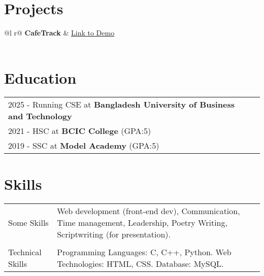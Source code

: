 \documentclass[a4paper,12pt]{article}
\begin{document}
  
\section{Projects}

\begin{tabularx}{\linewidth}{ @{}l r@{} }
\textbf{CafeTrack} & \hfill \href{https://github.com/samia-homayara/Cafetrack}{Link to Demo} \\[3.75pt]
  \\
\end{tabularx}

\section{Education}
\begin{tabularx}{\linewidth}{@{}l X@{}}	
2025 - Running CSE at \textbf{Bangladesh University of Business and Technology} \hfill \normalsize  \\

2021 - HSC at \textbf{BCIC College} (GPA:5) \\ 

2019 - SSC at \textbf{Model Academy}  (GPA:5) \\

\end{tabularx}

\section{Skills}
\begin{tabularx}{\linewidth}{@{}l X@{}}
Some Skills &  \normalsize{Web development (front-end dev), Communication, Time management, Leadership, Poetry Writing, Scriptwriting (for presentation).}\\
\\
Technical Skills  &  \normalsize{Programming Languages: C, C++, Python.
Web Technologies: HTML, CSS.
Database: MySQL.
}\\  
\end{tabularx}

\vfill
{}
\end{document}
